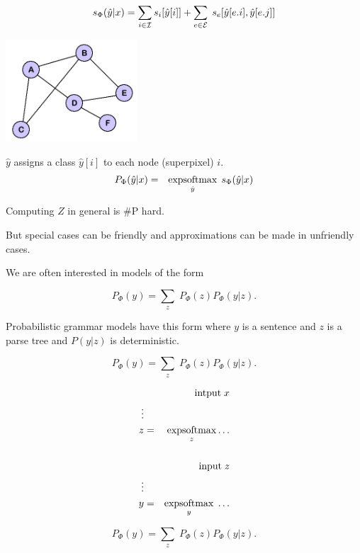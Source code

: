 {\vfill
{\color{red} $$s_\Phi(\hat{y}|x) = \sum_{i \in {\cal I}} s_i[\hat{y}[i]] + \sum_{e \in {\cal E}}\;s_e[\hat{y}[e.i],\hat{y}[e.j]]$$}

\bigskip
\centerline{\includegraphics[height= 1.5in]{../images/Graph}}
\medskip
$\hat{y} $ assigns a class $\hat{y}[i]$ to each node (superpixel) $i$.
\bigskip
\bigskip
{\color{red}
\begin{eqnarray*}
P_\Phi(\hat{y}|x) & = & \operatorname*{expsoftmax}_{\hat{y}}\;s_\Phi(\hat{y}|x)
\end{eqnarray*}
}

\vfill
Computing $Z$ in general is \#P hard.

\vfill
{\color{red} But special cases can be friendly and approximations can be made in unfriendly cases.}


We are often interested in models of the form

\vfill
{\color{red} $$P_\Phi(y) = \sum_z\;P_\Phi(z)P_\Phi(y|z).$$}

\vfill
Probabilistic grammar models have this form where $y$ is a sentence and $z$ is a parse tree
and $P(y|z)$ is deterministic.


$$P_\Phi(y) = \sum_z\;P_\Phi(z)P_\Phi(y|z).$$

\vfill
{\color{red}
\begin{eqnarray*}
& & \mbox{intput}\; x \\
\vdots \\
z & = & \operatorname*{expsoftmax}_z \ldots \\
\\
& & \mbox{input}\; z \\
\vdots \\
y & = & \operatorname*{expsoftmax}_y\;\ldots
\end{eqnarray*}
}


{\color{red} $$P_\Phi(y) = \sum_z\;P_\Phi(z)P_\Phi(y|z).$$}

}
